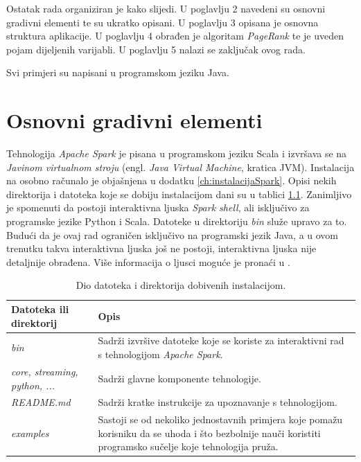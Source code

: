 \documentclass[times, utf8, zavrsni, numeric]{fer}
\begin{document}
Ostatak rada organiziran je kako slijedi. U poglavlju 2 navedeni su osnovni gradivni elementi te su ukratko opisani. U poglavlju 3 opisana je osnovna struktura aplikacije. U poglavlju 4 obrađen je algoritam \emph{PageRank} te je uveden pojam dijeljenih varijabli. U poglavlju 5 nalazi se zaključak ovog rada. 

Svi primjeri su napisani u programskom jeziku Java.

\chapter{Osnovni gradivni elementi}
Tehnologija \emph{Apache Spark} je pisana u programskom jeziku Scala i izvršava se na \emph{Javinom virtualnom stroju} (engl. \emph{Java Virtual Machine}, kratica JVM). Instalacija na osobno računalo je objašnjena u dodatku \ref{ch:instalacijaSpark}. Opisi nekih direktorija i datoteka koje se dobiju instalacijom dani su u tablici \ref{tbl:installPackage}. Zanimljivo je spomenuti da postoji interaktivna ljuska \emph{Spark shell}, ali isključivo za programske jezike Python i Scala. Datoteke u direktoriju \emph{bin} služe upravo za to. Budući da je ovaj rad ograničen isključivo na programski jezik Java, a u ovom trenutku takva interaktivna ljuska još ne postoji, interaktivna ljuska nije detaljnije obrađena. Više informacija o ljusci moguće je pronaći u \cite{learningSpark}.

\begin{table}[htb]
\caption{Dio datoteka i direktorija dobivenih instalacijom.}
\label{tbl:installPackage}
\centering
\begin{tabular}{l p{8cm}}
\hline
Datoteka ili direktorij & Opis \\
\hline
\emph{bin} & Sadrži izvršive datoteke koje se koriste za interaktivni rad s tehnologijom \emph{Apache Spark}.\\
\emph{core, streaming, python, ...} & Sadrži glavne komponente tehnologije. \\
\emph{README.md} & Sadrži kratke instrukcije za upoznavanje s tehnologijom.\\
\emph{examples} & Sastoji se od nekoliko jednostavnih primjera koje pomažu korisniku da se uhoda i što bezbolnije nauči koristiti programsko sučelje koje tehnologija pruža. \\
\hline
\end{tabular}
\end{table}
\end{document}
